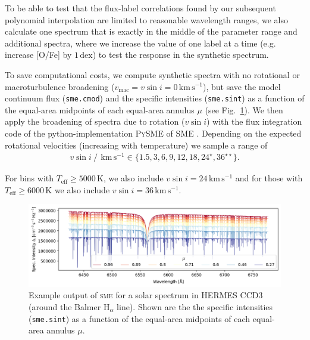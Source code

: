 \documentclass[
  journal=pasa,
  manuscript=research-paper, %
  year=2023,
  volume=37
]{cup-journal}
\newcommand{\Teff}{$T_\mathrm{eff}$\xspace}
\newcommand{\vsini}{$v \sin i$\xspace}
\newcommand{\sme}{\textsc{sme}\xspace}
\newcommand{\dex}{\,\mathrm{dex}}	%
\newcommand{\kms}{\,\mathrm{km\,s^{-1}}}	%
\begin{document}
To be able to test that the flux-label correlations found by our subsequent polynomial interpolation are limited to reasonable wavelength ranges, we also calculate one spectrum that is exactly in the middle of the parameter range and additional spectra, where we increase the value of one label at a time (e.g. increase [O/Fe] by $1\dex$) to test the response in the synthetic spectrum.

To save computational costs, we compute synthetic spectra with no rotational or macroturbulence broadening ($v_\text{mac} = v\sin i = 0\kms$), but save the model continuum flux (\texttt{sme.cmod}) and the specific intensities (\texttt{sme.sint}) as a function of the equal-area midpoints of each equal-area annulus $\mu$ (see Fig.~\ref{fig:sme_mu_output}). We then apply the broadening of spectra due to rotation (\vsini) with the flux integration code of the python-implementation \textsc{PySME} \citep{Wehrhahn2021} of \textsc{SME} \citep{Piskunov2017}. Depending on the expected rotational velocities (increasing with temperature) we sample a range of
\begin{align} \label{eq:vsini}
    v \sin i~/~\kms \in \{ 1.5, 3, 6, 9, 12, 18, 24^\star, 36^{\star \star}\}.
\end{align}

For bins with \Teff$\geq 5000\,\mathrm{K}$, we also include $v \sin i = 24 \kms$ and for those with \Teff$\geq 6000\,\mathrm{K}$ we also include $v \sin i = 36 \kms$. 

\begin{figure}[hbt!]
 \centering
 \includegraphics[width=\textwidth]{figures/solar_twin_specific_intensity.png}
 \caption{Example output of \sme for a solar spectrum in HERMES CCD3 (around the Balmer $\mathrm{H}_\alpha$ line). Shown are the the specific intensities (\texttt{sme.sint}) as a function of the equal-area midpoints of each equal-area annulus $\mu$.}
 \label{fig:sme_mu_output}
\end{figure}
\end{document}

